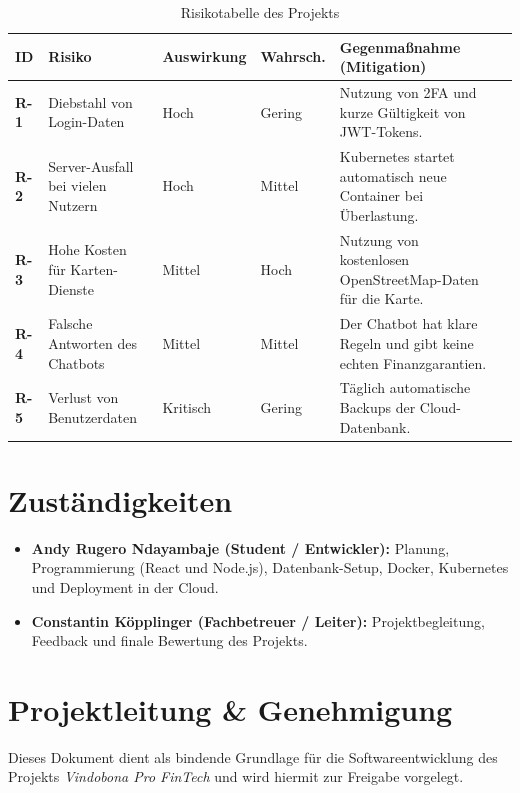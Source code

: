 \documentclass[11pt,a4paper]{article}
\begin{document}
\begin{table}[h]
\centering
\small
\begin{tabular}{lp{4cm}lllp{4cm}}
\toprule
\textbf{\color{accentred}ID} & \textbf{\color{accentred}Risiko} & \textbf{\color{accentred}Auswirkung} & \textbf{\color{accentred}Wahrsch.} & \textbf{\color{accentred}Gegenmaßnahme (Mitigation)} \\
\midrule
\textbf{R-1} & Diebstahl von Login-Daten & Hoch & Gering & Nutzung von 2FA und kurze Gültigkeit von JWT-Tokens. \\
\textbf{R-2} & Server-Ausfall bei vielen Nutzern & Hoch & Mittel & Kubernetes startet automatisch neue Container bei Überlastung. \\
\textbf{R-3} & Hohe Kosten für Karten-Dienste & Mittel & Hoch & Nutzung von kostenlosen OpenStreetMap-Daten für die Karte. \\
\textbf{R-4} & Falsche Antworten des Chatbots & Mittel & Mittel & Der Chatbot hat klare Regeln und gibt keine echten Finanzgarantien. \\
\textbf{R-5} & Verlust von Benutzerdaten & Kritisch & Gering & Täglich automatische Backups der Cloud-Datenbank. \\
\bottomrule
\end{tabular}
\caption{Risikotabelle des Projekts}
\end{table}

\section{Zuständigkeiten}
\begin{itemize}
    \item \textbf{\color{accentblue}Andy Rugero Ndayambaje (Student / Entwickler):} Planung, Programmierung (React und Node.js), Datenbank-Setup, Docker, Kubernetes und Deployment in der Cloud.
    \item \textbf{\color{accentblue}Constantin Köpplinger (Fachbetreuer / Leiter):} Projektbegleitung, Feedback und finale Bewertung des Projekts.
\end{itemize}

\section{Projektleitung \& Genehmigung}
Dieses Dokument dient als bindende Grundlage für die Softwareentwicklung des Projekts \textit{Vindobona Pro FinTech} und wird hiermit zur Freigabe vorgelegt.
\end{document}
